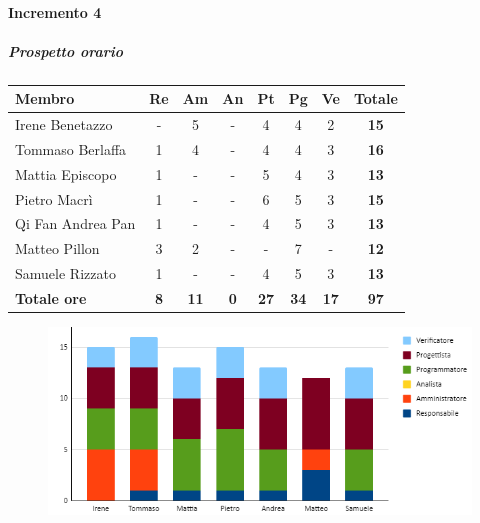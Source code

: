 \paragraph{Incremento 4}
\subparagraph{Prospetto orario}
\begin{center}
	\renewcommand{\arraystretch}{1.8} %
	\begin{tabular}{ |m{10em}|c|c|c|c|c|c|c| }
	\hline
	\textbf{Membro} & \textbf{Re} & \textbf{Am} &  \textbf{An} &  \textbf{Pt} &  \textbf{Pg} &  \textbf{Ve} &  \textbf{Totale}\\
    \hline
    Irene Benetazzo   & - & 5 & - & 4 & 4 & 2 & \textbf{15} \\
    \hline
    Tommaso Berlaffa  & 1 & 4 & - & 4 & 4 & 3 & \textbf{16} \\
    \hline
    Mattia Episcopo   & 1 & - & - & 5 & 4 & 3 & \textbf{13} \\
    \hline
    Pietro Macrì      & 1 & - & - & 6 & 5 & 3 & \textbf{15} \\
    \hline
    Qi Fan Andrea Pan & 1 & - & - & 4 & 5 & 3 & \textbf{13} \\
    \hline
    Matteo Pillon     & 3 & 2 & - & - & 7 & - & \textbf{12} \\
    \hline
    Samuele Rizzato   & 1 & - & - & 4 & 5 & 3 & \textbf{13} \\
    \hline
    \textbf{Totale ore} & \textbf{8} & \textbf{11} &  \textbf{0} &  \textbf{27} &  \textbf{34} &  \textbf{17} &  \textbf{97}\\
    \hline
	\end{tabular}
\end{center}
\begin{figure}[H]
   \centering\includegraphics{images/preventivo/PB-incremento4-ore.png}
\end{figure}



